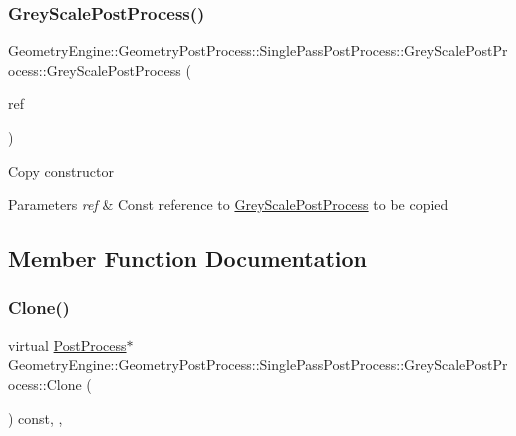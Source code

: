 \subsubsection{\texorpdfstring{GreyScalePostProcess()}{GreyScalePostProcess()}\hspace{0.1cm}{\footnotesize\ttfamily [2/2]}}
{\footnotesize\ttfamily Geometry\+Engine\+::\+Geometry\+Post\+Process\+::\+Single\+Pass\+Post\+Process\+::\+Grey\+Scale\+Post\+Process\+::\+Grey\+Scale\+Post\+Process (\begin{DoxyParamCaption}\item[{const \mbox{\hyperlink{class_geometry_engine_1_1_geometry_post_process_1_1_single_pass_post_process_1_1_grey_scale_post_process}{Grey\+Scale\+Post\+Process}} \&}]{ref }\end{DoxyParamCaption})\hspace{0.3cm}{\ttfamily [inline]}}

Copy constructor 
\begin{DoxyParams}{Parameters}
{\em ref} & Const reference to \mbox{\hyperlink{class_geometry_engine_1_1_geometry_post_process_1_1_single_pass_post_process_1_1_grey_scale_post_process}{Grey\+Scale\+Post\+Process}} to be copied \\
\hline
\end{DoxyParams}


\subsection{Member Function Documentation}
\mbox{\label{class_geometry_engine_1_1_geometry_post_process_1_1_single_pass_post_process_1_1_grey_scale_post_process_a36f198711874587c9cbf5c958e6d09ea}} 
\subsubsection{\texorpdfstring{Clone()}{Clone()}}
{\footnotesize\ttfamily virtual \mbox{\hyperlink{class_geometry_engine_1_1_geometry_post_process_1_1_post_process}{Post\+Process}}$\ast$ Geometry\+Engine\+::\+Geometry\+Post\+Process\+::\+Single\+Pass\+Post\+Process\+::\+Grey\+Scale\+Post\+Process\+::\+Clone (\begin{DoxyParamCaption}{ }\end{DoxyParamCaption}) const\hspace{0.3cm}{\ttfamily [inline]}, {\ttfamily [override]}, {\ttfamily [virtual]}}


